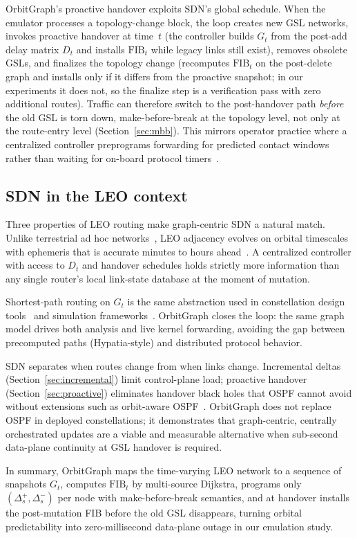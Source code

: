 OrbitGraph's proactive handover exploits SDN's global schedule.
When the emulator processes a topology-change block, the loop creates new GSL
networks, invokes proactive handover at time~$t$ (the controller builds
$G_t$ from the post-add delay matrix $D_t$ and installs $\mathrm{FIB}_t$ while
legacy links still exist), removes obsolete GSLs, and finalizes the topology
change (recomputes $\mathrm{FIB}_t$ on the post-delete graph and installs only
if it differs from the proactive snapshot; in our experiments it does not, so
the finalize step is a verification pass with zero additional routes).
Traffic can therefore switch to the post-handover path \emph{before} the old
GSL is torn down, make-before-break at the topology level, not only at the
route-entry level (Section~\ref{sec:mbb}).
This mirrors operator practice where a centralized controller preprograms
forwarding for predicted contact windows rather than waiting for on-board
protocol timers~\cite{lai2023starrynet,gregory:satellite-routing:2022}.

\subsection{SDN in the LEO context}

Three properties of LEO routing make graph-centric SDN a natural match.
Unlike terrestrial ad hoc networks~\cite{karp:gpsr:2000,perkins:aodv:1999},
LEO adjacency evolves on orbital timescales with ephemeris that is accurate
minutes to hours ahead~\cite{kassing2020exploring,lai2023starrynet}.
A centralized controller with access to $D_t$ and handover schedules holds
strictly more information than any single router's local link-state database at the
moment of mutation.

Shortest-path routing on $G_t$ is the same abstraction used in constellation
design tools~\cite{lai2020starperf,handley:ground-relays:2019} and simulation
frameworks~\cite{kempton2020silleo}.
OrbitGraph closes the loop: the same graph model drives both analysis
and live kernel forwarding, avoiding the gap between precomputed paths
(Hypatia-style) and distributed protocol behavior.

SDN separates when routes change from when links change.
Incremental deltas (Section~\ref{sec:incremental}) limit control-plane load;
proactive handover (Section~\ref{sec:proactive}) eliminates handover black
holes that OSPF cannot avoid without extensions such as orbit-aware
OSPF~\cite{pam:opspf:2019}.
OrbitGraph does not replace OSPF in deployed constellations; it demonstrates
that graph-centric, centrally orchestrated updates are a viable and measurable
alternative when sub-second data-plane continuity at GSL handover is required.

In summary, OrbitGraph maps the time-varying LEO network to a sequence of
snapshots $G_t$, computes $\mathrm{FIB}_t$ by multi-source Dijkstra,
programs only $(\Delta_s^{+}, \Delta_s^{-})$ per node with make-before-break
semantics, and at handover installs the post-mutation FIB before the old GSL
disappears, turning orbital predictability into zero-millisecond data-plane
outage in our emulation study.

